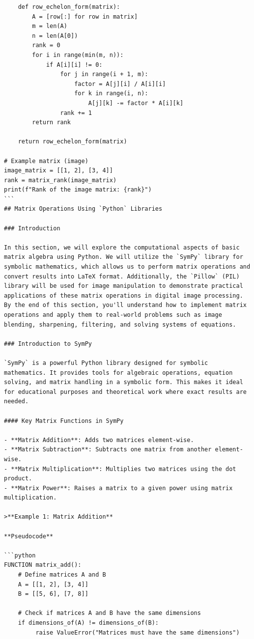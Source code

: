 \documentclass[
  letterpaper,
  DIV=11,
  numbers=noendperiod]{scrreprt}
\theoremstyle{plain}
\theoremstyle{definition}
\theoremstyle{remark}
\begin{document}
\begin{verbatim}
    def row_echelon_form(matrix):
        A = [row[:] for row in matrix]
        m = len(A)
        n = len(A[0])
        rank = 0
        for i in range(min(m, n)):
            if A[i][i] != 0:
                for j in range(i + 1, m):
                    factor = A[j][i] / A[i][i]
                    for k in range(i, n):
                        A[j][k] -= factor * A[i][k]
                rank += 1
        return rank

    return row_echelon_form(matrix)

# Example matrix (image)
image_matrix = [[1, 2], [3, 4]]
rank = matrix_rank(image_matrix)
print(f"Rank of the image matrix: {rank}")
```
## Matrix Operations Using `Python` Libraries

### Introduction

In this section, we will explore the computational aspects of basic matrix algebra using Python. We will utilize the `SymPy` library for symbolic mathematics, which allows us to perform matrix operations and convert results into LaTeX format. Additionally, the `Pillow` (PIL) library will be used for image manipulation to demonstrate practical applications of these matrix operations in digital image processing. By the end of this section, you'll understand how to implement matrix operations and apply them to real-world problems such as image blending, sharpening, filtering, and solving systems of equations.

### Introduction to SymPy

`SymPy` is a powerful Python library designed for symbolic mathematics. It provides tools for algebraic operations, equation solving, and matrix handling in a symbolic form. This makes it ideal for educational purposes and theoretical work where exact results are needed.

#### Key Matrix Functions in SymPy

- **Matrix Addition**: Adds two matrices element-wise.
- **Matrix Subtraction**: Subtracts one matrix from another element-wise.
- **Matrix Multiplication**: Multiplies two matrices using the dot product.
- **Matrix Power**: Raises a matrix to a given power using matrix multiplication.

>**Example 1: Matrix Addition**

**Pseudocode**

```python
FUNCTION matrix_add():
    # Define matrices A and B
    A = [[1, 2], [3, 4]]
    B = [[5, 6], [7, 8]]

    # Check if matrices A and B have the same dimensions
    if dimensions_of(A) != dimensions_of(B):
         raise ValueError("Matrices must have the same dimensions")


\end{verbatim}
\end{document}
